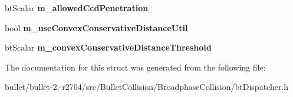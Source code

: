 \begin{DoxyCompactItemize}
\item 
\hypertarget{structbt_dispatcher_info_a4ac54510df1815c7a580c0b84d303048}{bt\+Scalar {\bfseries m\+\_\+allowed\+Ccd\+Penetration}}\label{structbt_dispatcher_info_a4ac54510df1815c7a580c0b84d303048}

\item 
\hypertarget{structbt_dispatcher_info_a90032e4af75bd84010f17e495f8cfe45}{bool {\bfseries m\+\_\+use\+Convex\+Conservative\+Distance\+Util}}\label{structbt_dispatcher_info_a90032e4af75bd84010f17e495f8cfe45}

\item 
\hypertarget{structbt_dispatcher_info_a98a9ecee681b0527e2d9e7a33c5a5fe2}{bt\+Scalar {\bfseries m\+\_\+convex\+Conservative\+Distance\+Threshold}}\label{structbt_dispatcher_info_a98a9ecee681b0527e2d9e7a33c5a5fe2}

\end{DoxyCompactItemize}


The documentation for this struct was generated from the following file\+:\begin{DoxyCompactItemize}
\item 
bullet/bullet-\/2.-\/r2704/src/\+Bullet\+Collision/\+Broadphase\+Collision/bt\+Dispatcher.\+h\end{DoxyCompactItemize}
